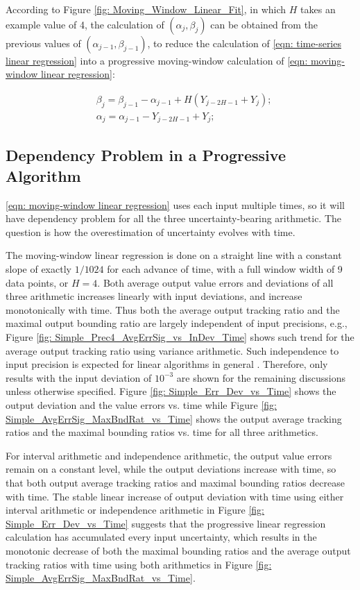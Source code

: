 \documentclass[twoside]{article}
\numberwithin{equation}{section}
\begin{document}
According to Figure \ref{fig: Moving_Window_Linear_Fit}, in which $H$ takes an example value of 4, the calculation of $(\alpha _{j}, \beta _{j})$ can be obtained from the previous values of $(\alpha _{j-1}, \beta _{j-1})$, to reduce the calculation of \eqref{eqn: time-series linear regression} into a progressive moving-window calculation of \eqref{eqn: moving-window linear regression}:

\begin{equation}
\begin{split}
\label{eqn: moving-window linear regression}
& \beta _{j} = \beta _{j-1} - \alpha _{j-1} + H(Y_{j-2H-1} + Y_{j}); \\
& \alpha _{j} = \alpha _{j-1} - Y_{j-2H-1} + Y_{j};
\end{split}
\end{equation}


\subsection{Dependency Problem in a Progressive Algorithm} 

\eqref{eqn: moving-window linear regression} uses each input multiple times, so it will have dependency problem for all the three uncertainty-bearing arithmetic.  The question is how the overestimation of uncertainty evolves with time. 

The moving-window linear regression is done on a straight line with a constant slope of exactly $1/1024$ for each advance of time, with a full window width of 9 data points, or $H=4$.  Both average output value errors and deviations of all three arithmetic increases linearly with input deviations, and increase monotonically with time.  Thus both the average output tracking ratio and the maximal output bounding ratio are largely independent of input precisions, e.g., Figure \ref{fig: Simple_Prec4_AvgErrSig_vs_InDev_Time} shows such trend for the average output tracking ratio using variance arithmetic.  Such independence to input precision is expected for linear algorithms in general \cite{Numerical_Recipes}.  Therefore, only results with the input deviation of $10^{-3}$ are shown for the remaining discussions unless otherwise specified.  Figure \ref{fig: Simple_Err_Dev_vs_Time} shows the output deviation and the value errors vs. time while Figure \ref{fig: Simple_AvgErrSig_MaxBndRat_vs_Time} shows the output average tracking ratios and the maximal bounding ratios vs. time for all three arithmetics.  

For interval arithmetic and independence arithmetic, the output value errors remain on a constant level, while the output deviations increase with time, so that both output average tracking ratios and maximal bounding ratios decrease with time.  The stable linear increase of output deviation with time using either interval arithmetic or independence arithmetic in Figure \ref{fig: Simple_Err_Dev_vs_Time} suggests that the progressive linear regression calculation has accumulated every input uncertainty, which results in the monotonic decrease of both the maximal bounding ratios and the average output tracking ratios with time using both arithmetics in Figure \ref{fig: Simple_AvgErrSig_MaxBndRat_vs_Time}.
\end{document}
